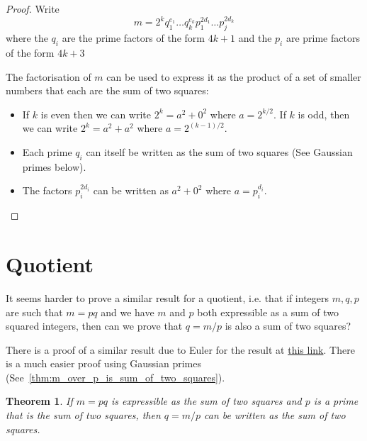 \documentclass[11pt]{amsart}
\newtheorem{theorem}{Theorem}[section]
\begin{document}
\begin{proof}
Write 
$$
m = 2^k q_{1}^{e_1} \ldots q_{k}^{e_k} p_{1}^{2 d_1} \ldots p_{j}^{2 d_k} 
$$
where the $q_i$ are the prime factors of the form $4k+1$ and the $p_i$ are prime factors of the form $4k+3$

The factorisation of $m$ can be used to express it as the product of a set of smaller numbers that each are the sum of two squares:
\begin{itemize}
\item
If $k$ is even then we can write $2^k = a^{2} + 0^{2}$ where $a = 2^{k/2}$. If $k$ is odd, then we can write $2^{k} = a^{2} + a^{2}$ where $a = 2^{(k-1)/2}$.
\item
Each prime $q_{i}$ can itself be written as the sum of two squares (See Gaussian primes below).
\item
The factors $p_{i}^{2 d_{i}}$ can be written as $a^{2} + 0^{2}$ where $a = p_{i}^{d_{i}}$.
\end{itemize}





\end{proof}



\section{Quotient}

It seems harder to prove a similar result for a quotient, i.e. that if integers $m, q, p$ are such that $m = p q$ and we have $m$ and $p$ both expressible as a sum of two squared integers, then can we prove that $q = m / p$ is also a sum of two squares?

There is a proof of a similar result due to Euler for the result
at
\href{http://eulerarchive.maa.org/docs/translations/E228en.pdf}{this link}. There is a much easier proof using Gaussian primes (See~\cref{thm:m_over_p_is_sum_of_two_squares}).

\begin{theorem}
If $m = pq$ is expressible as the sum of two squares and $p$ is a prime that is the sum of two squares, then $q = m / p$ can be written as the sum of two squares.
\end{theorem}
\end{document}
